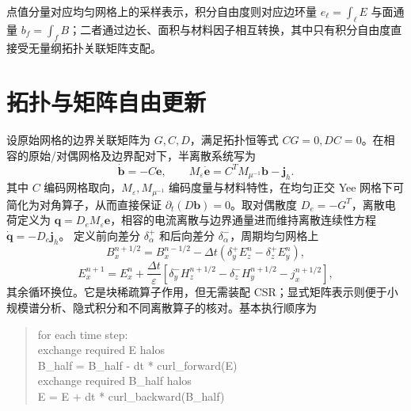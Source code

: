 点值分量对应均匀网格上的采样表示，积分自由度则对应边环量 $e_\ell=\int_\ell E$ 与面通量 $b_f=\int_f B$；二者通过边长、面积与材料因子相互转换，其中只有积分自由度直接受无量纲拓扑关联矩阵支配。
\section{拓扑与矩阵自由更新}
设原始网格的边界关联矩阵为 $G,C,D$，满足拓扑恒等式 $CG=0,DC=0$。在相容的原始/对偶网格及边界配对下，半离散系统写为
\[
 \dot{\bm b}=-C\bm e,\qquad
 M_\varepsilon\dot{\bm e}=C^TM_{\mu^{-1}}\bm b-\bm j_h .
\]
其中 $C$ 编码网格取向，$M_\varepsilon,M_{\mu^{-1}}$ 编码度量与材料特性，在均匀正交 Yee 网格下可简化为对角算子，从而直接保证 $\partial_t(D\bm b)=0$。取对偶散度 $D_e=-G^T$，离散电荷定义为 $\bm q=D_eM_\varepsilon\bm e$，相容的电流离散与边界通量进而维持离散连续性方程 $\dot{\bm q}=-D_e\bm j_h$。
定义前向差分 $\delta_\alpha^+$ 和后向差分 $\delta_\alpha^-$，周期均匀网格上
\[
 B_x^{n+1/2}=B_x^{n-1/2}
 -\Delta t(\delta_y^+E_z^n-\delta_z^+E_y^n),
\]
\[
 E_x^{n+1}=E_x^n+\frac{\Delta t}{\varepsilon}
 [\delta_y^-H_z^{n+1/2}-\delta_z^-H_y^{n+1/2}-j_x^{n+1/2}],
\]
其余循环换位。它是块稀疏算子作用，但无需装配 CSR；显式矩阵表示则便于小规模谱分析、隐式积分和不同离散算子的核对。基本执行顺序为
\begin{quote}\ttfamily\small
for each time step:\\
\quad exchange required E halos\\
\quad B\_half = B\_half - dt * curl\_forward(E)\\
\quad exchange required B\_half halos\\
\quad E = E + dt * curl\_backward(B\_half)
\end{quote}
